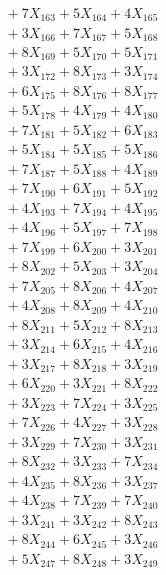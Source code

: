 \documentclass[a4paper,10pt]{article}
\begin{document}
{\begin{align}
&\;  + 7 X_{163} + 5 X_{164} + 4 X_{165} \\[0.3ex]
&\;  + 3 X_{166} + 7 X_{167} + 5 X_{168} \\[0.3ex]
&\;  + 8 X_{169} + 5 X_{170} + 5 X_{171} \\[0.3ex]
&\;  + 3 X_{172} + 8 X_{173} + 3 X_{174} \\[0.3ex]
&\;  + 6 X_{175} + 8 X_{176} + 8 X_{177} \\[0.3ex]
&\;  + 5 X_{178} + 4 X_{179} + 4 X_{180} \\[0.3ex]
&\;  + 7 X_{181} + 5 X_{182} + 6 X_{183} \\[0.3ex]
&\;  + 5 X_{184} + 5 X_{185} + 5 X_{186} \\[0.3ex]
&\;  + 7 X_{187} + 5 X_{188} + 4 X_{189} \\[0.5ex]\allowbreak
&\;  + 7 X_{190} + 6 X_{191} + 5 X_{192} \\[0.3ex]
&\;  + 4 X_{193} + 7 X_{194} + 4 X_{195} \\[0.3ex]
&\;  + 4 X_{196} + 5 X_{197} + 7 X_{198} \\[0.3ex]
&\;  + 7 X_{199} + 6 X_{200} + 3 X_{201} \\[0.3ex]
&\;  + 8 X_{202} + 5 X_{203} + 3 X_{204} \\[0.3ex]
&\;  + 7 X_{205} + 8 X_{206} + 4 X_{207} \\[0.3ex]
&\;  + 4 X_{208} + 8 X_{209} + 4 X_{210} \\[0.3ex]
&\;  + 8 X_{211} + 5 X_{212} + 8 X_{213} \\[0.3ex]
&\;  + 3 X_{214} + 6 X_{215} + 4 X_{216} \\[0.3ex]
&\;  + 3 X_{217} + 8 X_{218} + 3 X_{219} \\[0.5ex]\allowbreak
&\;  + 6 X_{220} + 3 X_{221} + 8 X_{222} \\[0.3ex]
&\;  + 3 X_{223} + 7 X_{224} + 3 X_{225} \\[0.3ex]
&\;  + 7 X_{226} + 4 X_{227} + 3 X_{228} \\[0.3ex]
&\;  + 3 X_{229} + 7 X_{230} + 3 X_{231} \\[0.3ex]
&\;  + 8 X_{232} + 3 X_{233} + 7 X_{234} \\[0.3ex]
&\;  + 4 X_{235} + 8 X_{236} + 3 X_{237} \\[0.3ex]
&\;  + 4 X_{238} + 7 X_{239} + 7 X_{240} \\[0.3ex]
&\;  + 3 X_{241} + 3 X_{242} + 8 X_{243} \\[0.3ex]
&\;  + 8 X_{244} + 6 X_{245} + 3 X_{246} \\[0.3ex]
&\;  + 5 X_{247} + 8 X_{248} + 3 X_{249} \\[0.5ex]\allowbreak

\end{align}}
\end{document}
